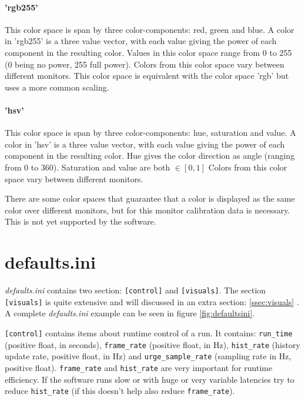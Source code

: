\documentclass[12pt,a4paper]{book}
\begin{document}
\paragraph{'rgb255'} This color space is span by three color-components: red, green and blue. A color in 'rgb255' is a three value vector, with each value giving the power of each component in the resulting color. Values in this color space range from 0 to 255 (0 being no power, 255 full power). Colors from this color space vary between different monitors. This color space is equivalent with the color space 'rgb' but uses a more common scaling.

\paragraph{'hsv'} This color space is span by three color-components: hue, saturation and value. A color in 'hsv' is a three value vector, with each value giving the power of each component in the resulting color. Hue gives the color direction as angle (ranging from 0 to 360). Saturation and value are both $\in [0,1] $ Colors from this color space vary between different monitors.

\vspace{1.5em}
There are some color spaces that guarantee that a color is displayed as the same color over different monitors, but for this monitor calibration data is necessary. This is not yet supported by the software.

\section{defaults.ini}

\textit{defaults.ini} contains two section: \verb|[control]| and \verb|[visuals]|. The section \verb|[visuals]| is quite extensive and will discussed in an extra section: \ref{ssec:visuals} . A complete \textit{defaults.ini} example can be seen in figure \ref{fig:defaultsini}.

\verb|[control]| contains items about runtime control of a run. It contains: \verb|run_time| (positive float, in seconds), \verb|frame_rate| (positive float, in Hz), \verb|hist_rate| (history update rate, positive float, in Hz) and \verb|urge_sample_rate| (sampling rate in Hz, positive float). \verb|frame_rate| and \verb|hist_rate| are very important for runtime efficiency. If the software runs slow or with huge or very variable latencies try to reduce \verb|hist_rate| (if this doesn't help also reduce \verb|frame_rate|).
\end{document}
